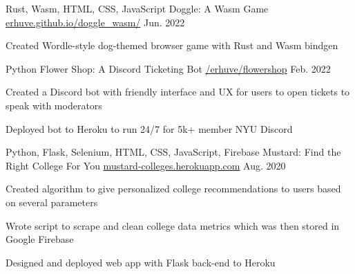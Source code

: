 

\begin{cventries}
  \cventry
    {Rust, Wasm, HTML, CSS, JavaScript} %
    {Doggle: A Wasm Game} %
    {\href{https://erhuve.github.io/doggle_wasm}{erhuve.github.io/doggle\_wasm/}} %
    {Jun. 2022} %
    {
      \begin{cvitems} %
        \item {Created Wordle-style dog-themed browser game with Rust and Wasm bindgen}
      \end{cvitems}
    }
    
  \cventry
    {Python} %
    {Flower Shop: A Discord Ticketing Bot} %
    {\href{https://github.com/erhuve/flowershop}{/erhuve/flowershop}} %
    {Feb. 2022} %
    {
      \begin{cvitems} %
        \item {Created a Discord bot with friendly interface and UX for users to open tickets to speak with moderators}
        \item {Deployed bot to Heroku to run 24/7 for 5k+ member NYU Discord}
      \end{cvitems}
    }

  \cventry
    {Python, Flask, Selenium, HTML, CSS, JavaScript, Firebase} %
    {Mustard: Find the Right College For You} %
    {\href{http://mustard-colleges.herokuapp.com/}{mustard-colleges.herokuapp.com}} %
    {Aug. 2020} %
    {
      \begin{cvitems} %
        \item {Created algorithm to give personalized college recommendations to users based on several parameters}
        \item {Wrote script to scrape and clean college data metrics which was then stored in Google Firebase}
        \item {Designed and deployed web app with Flask back-end to Heroku}
      \end{cvitems}
    }
\end{cventries}
